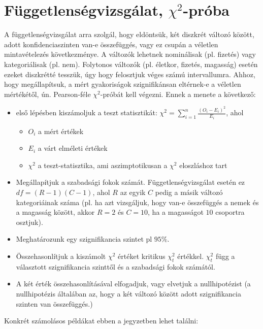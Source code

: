 \documentclass[12pt]{article}
\theoremstyle{plain}
\begin{document}
\section{Függetlenségvizsgálat, $\chi^2$-próba}
A függetlenségvizsgálat arra szolgál, hogy eldöntsük, két diszkrét változó között, adott konfidenciaszinten van-e
összefüggés, vagy ez csupán a véletlen mintavételezés következménye. A változók lehetnek nominálisak (pl. fizetés)
vagy kategoriálisak (pl. nem). Folytonos változók (pl. életkor, fizetés, magasság) esetén ezeket diszkrétté tesszük, 
úgy hogy felosztjuk véges számú intervallumra. Ahhoz, hogy megállapítsuk, a mért gyakoriságok szignifikánsan eltérnek-e
a véletlen mértékétől, ún. Pearson-féle $\chi^2$-próbát kell végezni. Ennek a menete a következő:
\begin{itemize}
    \item első lépésben kiszámoljuk a teszt statisztikát: $\displaystyle{\chi^2 = \sum\limits_{i=1}^{n} \frac{(O_i-E_i)^2}{E_i}}$, ahol
    \begin{itemize}
        \item $O_i$ a mért értékek
        \item $E_i$ a várt elméleti értékek
        \item $\chi^2$ a teszt-statisztika, ami aszimptotikusan a $\chi^2$ eloszláshoz tart
    \end{itemize}
    \item Megállapítjuk a szabadsági fokok számát. Függetlenségvizsgálat esetén ez $df=(R-1)(C-1)$, ahol
    $R$ az egyik $C$ pedig a másik változó kategoriáinak száma (pl. ha azt vizsgáljuk, hogy van-e összefüggés a nemek és 
    a magasság között, akkor $R=2$ és $C=10$, ha a magasságot $10$ csoportra osztjuk).
    \item Meghatározunk egy szignifikancia szintet pl $95\%$.
    \item Összehasonlítjuk a kiszámolt $\chi^2$ értéket kritikus $\chi^2_t$ értékkel. $\chi^2_t$ függ a választott
    szignifikancia szinttől és a szabadsági fokok számától.
    \item A két érték összehasonlításával elfogadjuk, vagy elvetjuk a nullhipotézist (a nullhipotézis általában az, hogy
    a két változó között adott szignifikancia szinten van összefüggés.)
\end{itemize}
Konkrét számolásos példákat ebben a jegyzetben lehet találni: \cite{chi2jegyz}



 

\end{document}
